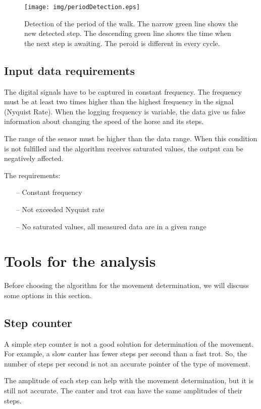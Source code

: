 \begin{figure}
    \centering
    \label{fig:graphPeriodicalMovement}
    \caption{Detection of the period of the walk. The narrow green line shows the new detected step. The descending green line shows the time when the next step is awaiting. The peroid is different in every cycle.}
    \texttt{[image: img/periodDetection.eps]}
\end{figure}

\subsection{Input data requirements}
The digital signals have to be captured in constant frequency. \cite{DSPbook} The frequency must be at least two times higher than the highest frequency in the signal (Nyquist Rate). \cite{NyquistRate} When the logging frequency is variable, the data give us false information about changing the speed of the horse and its steps.

The range of the sensor must be higher than the data range. When this condition is not fulfilled and the algorithm receives saturated values, the output can be negatively affected.

The requirements:
\begin{itemize}
    \item[--] Constant frequency
    \item[--] Not exceeded Nyquist rate
    \item[--] No saturated values, all measured data are in a given range
\end{itemize}

\section{Tools for the analysis}
Before choosing the algorithm for the movement determination, we will discuss some options in this section.

\subsection{Step counter}
\label{stepCounter}
A simple step counter is not a good solution for determination of the movement. For example, a slow canter has fewer steps per second than a fast trot. So, the number of steps per second is not an accurate pointer of the type of movement.

The amplitude of each step can help with the movement determination, but it is still not accurate. The canter and trot can have the same amplitudes of their steps.

